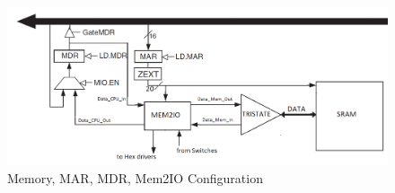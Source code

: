 \documentclass[journal, twocolumn, final,11pt,letterpaper]{IEEEtran}
\begin{document}
\begin{figure} [htbp]
	\centering
	\includegraphics[scale=0.4]{Memory_Circuit.png}
	\caption{Memory, MAR, MDR, Mem2IO Configuration\label{fig:Memory-Circuit}}
\end{figure}


\end{document}
